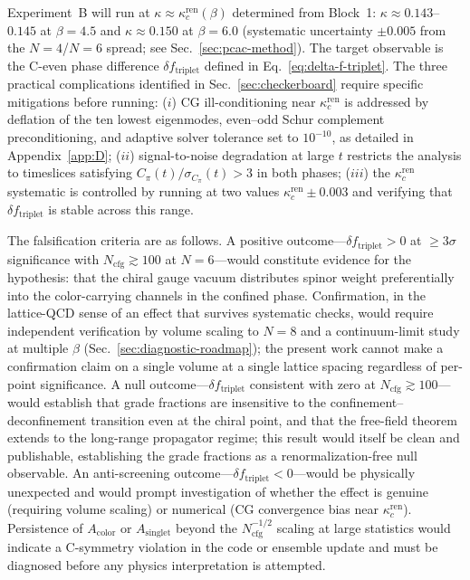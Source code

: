 \documentclass[12pt]{article}
\theoremstyle{definition}
\theoremstyle{remark}
\newcommand{\kcren}{\kappa_{c}^{\mathrm{ren}}}      %
\newcommand{\dftriplet}{\delta f_{\mathrm{triplet}}}  %
\newcommand{\Ncfg}{N_{\mathrm{cfg}}}                  %
\begin{document}
	Experiment~B will run at $\kappa\approx\kcren(\beta)$ determined from Block~1:
	$\kappa\approx0.143$--$0.145$ at $\beta=4.5$ and $\kappa\approx0.150$ at
	$\beta=6.0$ (systematic uncertainty $\pm0.005$ from the $N=4$/$N=6$ spread;
	see Sec.~\ref{sec:pcac-method}).  The target observable is the C-even phase
	difference $\dftriplet$ defined in Eq.~\eqref{eq:delta-f-triplet}.  The three
	practical complications
	identified in Sec.~\ref{sec:checkerboard} require specific mitigations before
	running: ($i$) CG ill-conditioning near $\kcren$ is addressed by deflation of
	the ten lowest eigenmodes, even--odd Schur complement preconditioning, and
	adaptive solver tolerance set to $10^{-10}$, as detailed in
	Appendix~\ref{app:D}; ($ii$) signal-to-noise degradation at large $t$ restricts
	the analysis to timeslices satisfying $C_\pi(t)/\sigma_{C_\pi}(t)>3$ in both
	phases; ($iii$) the $\kcren$ systematic is controlled by running at two values
	$\kcren\pm0.003$ and verifying that $\dftriplet$ is stable across this range.
	
	The falsification criteria are as follows.  A positive outcome---$\dftriplet>0$
	at $\geq3\sigma$ significance with $\Ncfg\gtrsim100$ at $N=6$---would
	constitute evidence for the hypothesis: that the chiral gauge vacuum
	distributes spinor weight preferentially into the color-carrying channels in
	the confined phase.  Confirmation, in the lattice-QCD sense of an effect that
	survives systematic checks, would require independent verification by volume
	scaling to $N=8$ and a continuum-limit study at multiple $\beta$
	(Sec.~\ref{sec:diagnostic-roadmap}); the present work cannot make a
	confirmation claim on a single volume at a single lattice spacing regardless of
	per-point significance.  A null outcome---$\dftriplet$ consistent with zero at
	$\Ncfg\gtrsim100$---would establish that grade fractions are insensitive to the
	confinement--deconfinement transition even at the chiral point, and that the
	free-field theorem extends to the long-range propagator regime; this result
	would itself be clean and publishable, establishing the grade fractions as a
	renormalization-free null observable.  An anti-screening
	outcome---$\dftriplet<0$---would be physically unexpected and would prompt
	investigation of whether the effect is genuine (requiring volume scaling) or
	numerical (CG convergence bias near $\kcren$).  Persistence of
	$A_{\mathrm{color}}$ or $A_{\mathrm{singlet}}$ beyond the $\Ncfg^{-1/2}$
	scaling at large statistics would indicate a C-symmetry violation in the code
	or ensemble update and must be diagnosed before any physics interpretation is
	attempted.
	
\end{document}
